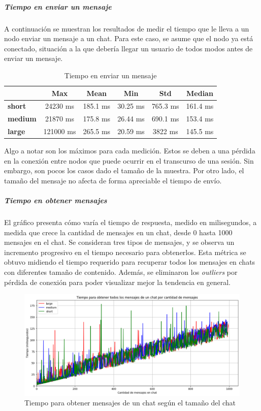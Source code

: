 \subparagraph{Tiempo en enviar un mensaje}

A continuación se muestran los resultados de medir el tiempo que le lleva a un nodo enviar un mensaje a un chat. Para este caso, se asume que el nodo ya está conectado, situación a la que debería llegar un usuario de todos modos antes de enviar un mensaje.

\setlength\tabcolsep{10pt}
\begin{table}[!htbp]
    \centering
    \begin{tabular}{|l|c|c|c|c|c|}
        \hline
        & \textbf{Max} & \textbf{Mean} & \textbf{Min} & \textbf{Std} & \textbf{Median} \\ \hline
        \textbf{short} & 24230 ms & 185.1 ms & 30.25 ms & 765.3 ms & 161.4 ms \\ \hline
        \textbf{medium} & 21870 ms & 175.8 ms & 26.44 ms & 690.1 ms & 153.4 ms \\ \hline
        \textbf{large} & 121000 ms & 265.5 ms & 20.59 ms & 3822 ms & 145.5 ms \\ \hline
    \end{tabular}
    \caption{Tiempo en enviar un mensaje}
\end{table}

Algo a notar son los máximos para cada medición. Estos se deben a una pérdida en la conexión entre nodos que puede ocurrir en el transcurso de una sesión. Sin embargo, son pocos los casos dado el tamaño de la muestra. Por otro lado, el tamaño del mensaje no afecta de forma apreciable el tiempo de envío.

\subparagraph{Tiempo en obtener mensajes}

El gráfico presenta cómo varía el tiempo de respuesta, medido en milisegundos, a medida que crece la cantidad de mensajes en un chat, desde 0 hasta 1000 mensajes en el chat. Se consideran tres tipos de mensajes, y se observa un incremento progresivo en el tiempo necesario para obtenerlos. Esta métrica se obtuvo midiendo el tiempo requerido para recuperar todos los mensajes en chats con diferentes tamaño de contenido. Además, se eliminaron los \textit{outliers} por pérdida de conexión para poder visualizar mejor la tendencia en general.

\begin{figure}[h!]
    \centering
    \includegraphics[width=1\linewidth]{img/metricas-ipfs/tiempo-para-obtener-por-cant-msjs.png}
    \caption{Tiempo para obtener mensajes de un chat según el tamaño del chat}
    \label{fig:ipfs-get-message-graphic.png}
\end{figure}

